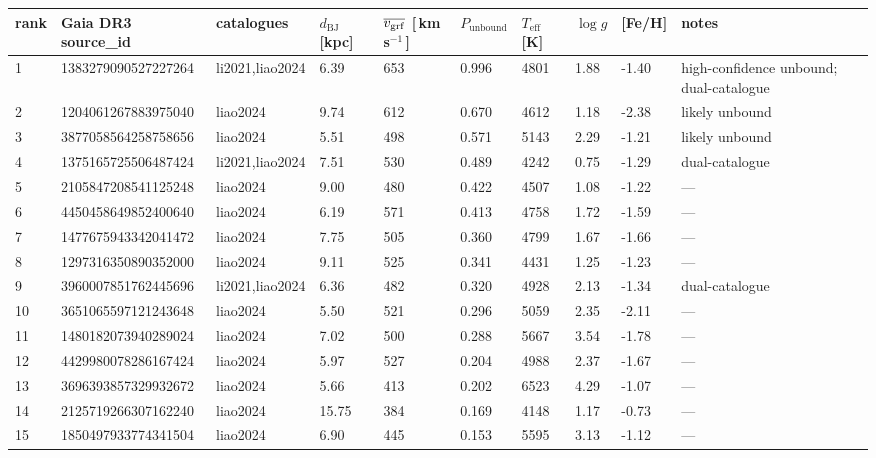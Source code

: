 \begin{tabular}{llllllllll}
\toprule
rank & Gaia DR3 source\_id & catalogues & $d_\mathrm{BJ}$ [kpc] & $\overline{v_{\rm grf}}$ [\,km\,s$^{-1}$\,] & $P_\mathrm{unbound}$ & $T_\mathrm{eff}$ [K] & $\log g$ & [Fe/H] & notes \\
\midrule
1 & 1383279090527227264 & li2021,liao2024 & 6.39 & 653 & 0.996 & 4801 & 1.88 & -1.40 & high-confidence unbound; dual-catalogue \\
2 & 1204061267883975040 & liao2024 & 9.74 & 612 & 0.670 & 4612 & 1.18 & -2.38 & likely unbound \\
3 & 3877058564258758656 & liao2024 & 5.51 & 498 & 0.571 & 5143 & 2.29 & -1.21 & likely unbound \\
4 & 1375165725506487424 & li2021,liao2024 & 7.51 & 530 & 0.489 & 4242 & 0.75 & -1.29 & dual-catalogue \\
5 & 2105847208541125248 & liao2024 & 9.00 & 480 & 0.422 & 4507 & 1.08 & -1.22 & --- \\
6 & 4450458649852400640 & liao2024 & 6.19 & 571 & 0.413 & 4758 & 1.72 & -1.59 & --- \\
7 & 1477675943342041472 & liao2024 & 7.75 & 505 & 0.360 & 4799 & 1.67 & -1.66 & --- \\
8 & 1297316350890352000 & liao2024 & 9.11 & 525 & 0.341 & 4431 & 1.25 & -1.23 & --- \\
9 & 3960007851762445696 & li2021,liao2024 & 6.36 & 482 & 0.320 & 4928 & 2.13 & -1.34 & dual-catalogue \\
10 & 3651065597121243648 & liao2024 & 5.50 & 521 & 0.296 & 5059 & 2.35 & -2.11 & --- \\
11 & 1480182073940289024 & liao2024 & 7.02 & 500 & 0.288 & 5667 & 3.54 & -1.78 & --- \\
12 & 4429980078286167424 & liao2024 & 5.97 & 527 & 0.204 & 4988 & 2.37 & -1.67 & --- \\
13 & 3696393857329932672 & liao2024 & 5.66 & 413 & 0.202 & 6523 & 4.29 & -1.07 & --- \\
14 & 2125719266307162240 & liao2024 & 15.75 & 384 & 0.169 & 4148 & 1.17 & -0.73 & --- \\
15 & 1850497933774341504 & liao2024 & 6.90 & 445 & 0.153 & 5595 & 3.13 & -1.12 & --- \\
\bottomrule
\end{tabular}
